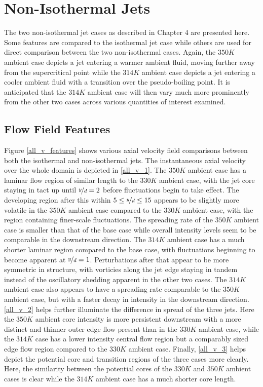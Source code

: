 \section{Non-Isothermal Jets}
The two non-isothermal jet cases as described in Chapter 4 are presented here. Some features are compared to the isothermal jet case while others are used for direct comparison between the two non-isothermal cases. Again, the $350 K$ ambient case depicts a jet entering a warmer ambient fluid, moving further away from the supercritical point while the $314 K$ ambient case depicts a jet entering a cooler ambient fluid with a transition over the pseudo-boiling point. It is anticipated that the $314 K$ ambient case will then vary much more prominently from the other two cases across various quantities of interest examined. 
\subsection{Flow Field Features}
Figure \ref{all_v_features} shows various axial velocity field comparisons between both the isothermal and non-isothermal jets. The instantaneous axial velocity over the whole domain is depicted in \ref{all_v_1}. The $350 K$ ambient case has a laminar flow region of similar length to the $330 K $ ambient case, with the jet core staying in tact up until $\nicefrac{y}{d} = 2$ before fluctuations begin to take effect. The developing region after this within $5 \leq \nicefrac{y}{d} \leq 15$ appears to be slightly more volatile in the $350 K$ ambient case compared to the $330 K$ ambient case, with the region containing finer-scale fluctuations. The spreading rate of the $350 K$ ambient case is smaller than that of the base case while overall intensity levels seem to be comparable in the downstream direction. The $314 K$ ambient case has a much shorter laminar region compared to the base case, with fluctuations beginning to become apparent at $\nicefrac{y}{d} = 1$. Perturbations after that appear to be more symmetric in structure, with vorticies along the jet edge staying in tandem instead of the oscillatory shedding apparent in the other two cases. The $314 K$ ambient case also appears to have a spreading rate comparable to the $350 K$ ambient case, but with a faster decay in intensity in the downstream direction. \ref{all_v_2} helps further illuminate the difference in spread of the three jets. Here the $350 K$ ambient core intensity is more persistent downstream with a more distinct and thinner outer edge flow present than in the $330 K$ ambient case, while the $314 K$ case has a lower intensity central flow region but a comparably sized edge flow region compared to the $330 K$ ambient case. Finally, \ref{all_v_3} helps depict the potential core and transition regions of the three cases more clearly. Here, the similarity between the potential cores of the $330 K$ and $350 K$ ambient cases is clear while the $314 K$ ambient case has a much shorter core length. 

